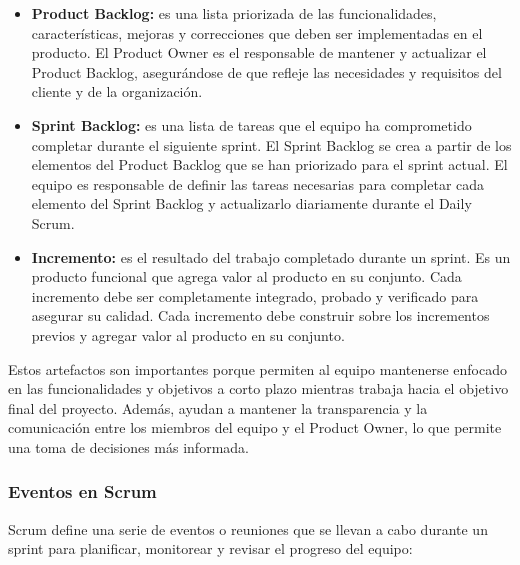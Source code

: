 \documentclass[executivepaper]{article}
\begin{document}
\begin{itemize}
\item \textbf{Product Backlog:} es una lista priorizada de las funcionalidades, características, mejoras y correcciones que deben ser implementadas en el producto. El Product Owner es el responsable de mantener y actualizar el Product Backlog, asegurándose de que refleje las necesidades y requisitos del cliente y de la organización.
\item \textbf{Sprint Backlog:} es una lista de tareas que el equipo ha comprometido completar durante el siguiente sprint. El Sprint Backlog se crea a partir de los elementos del Product Backlog que se han priorizado para el sprint actual. El equipo es responsable de definir las tareas necesarias para completar cada elemento del Sprint Backlog y actualizarlo diariamente durante el Daily Scrum.
\item \textbf{Incremento:} es el resultado del trabajo completado durante un sprint. Es un producto funcional que agrega valor al producto en su conjunto. Cada incremento debe ser completamente integrado, probado y verificado para asegurar su calidad. Cada incremento debe construir sobre los incrementos previos y agregar valor al producto en su conjunto.
\end{itemize}

Estos artefactos son importantes porque permiten al equipo mantenerse enfocado en las funcionalidades y objetivos a corto plazo mientras trabaja hacia el objetivo final del proyecto. Además, ayudan a mantener la transparencia y la comunicación entre los miembros del equipo y el Product Owner, lo que permite una toma de decisiones más informada.

\subsubsection*{Eventos en Scrum}

Scrum define una serie de eventos o reuniones que se llevan a cabo durante un sprint para planificar, monitorear y revisar el progreso del equipo:
\end{document}

